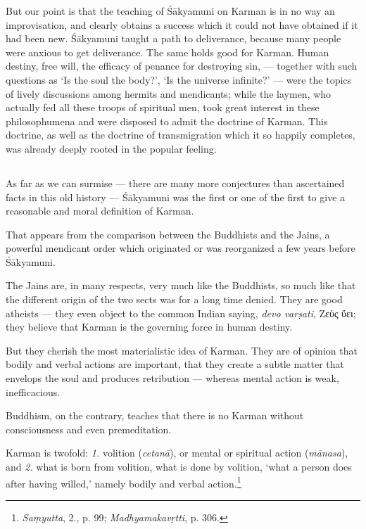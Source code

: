 \documentclass[a4paper, 11pt, oneside, english]{article}
\begin{document}
But our point is that the teaching of Śākyamuni on Karman is in no way an improvisation, and clearly obtains a success which it could not have obtained if it had been new. Śākyamuni taught a path to deliverance, because many people were anxious to get deliverance. The same holds good for Karman. Human destiny, free will, the efficacy of penance for destroying sin, --- together with such questions as `Is the soul the body?', `Is the universe infinite?' --- were the topics of lively discussions among hermits and mendicants; while the laymen, who actually fed all these troops of spiritual men, took great interest in these philosophumena and were disposed to admit the doctrine of Karman. This doctrine, as well as the doctrine of transmigration which it so happily completes, was already deeply rooted in the popular feeling.

\subsection{}
\paragraph{}
As far as we can surmise --- there are many more conjectures than ascertained facts in this old history --- Śākyamuni was the first or one of the first to give a reasonable and moral definition of Karman.

That appears from the comparison between the Buddhists and the Jains, a powerful mendicant order which originated or was reorganized a few years before Śākyamuni.

The Jains are, in many respects, very much like the Buddhists, so much like that the different origin of the two sects was for a long time denied. They are good atheists --- they even object to the common Indian saying, \emph{devo varṣati}, Ζεὺς ὕει; they believe that Karman is the governing force in human destiny.

But they cherish the most materialistic idea of Karman. They are of opinion that bodily and verbal actions are important, that they create a subtle matter that envelops the soul and produces retribution --- whereas mental action is weak, inefficacious.

Buddhism, on the contrary, teaches that there is no Karman without consciousness and even premeditation.

Karman is twofold: \emph{1.} volition (\emph{cetanā}), or mental or spiritual action (\emph{mānasa}), and \emph{2.} what is born from volition, what is done by volition, `what a person does after having willed,' namely bodily and verbal action.\footnote{\emph{Saṃyutta}, 2., p. 99; \emph{Madhyamakavṛtti}, p. 306.}
\end{document}
